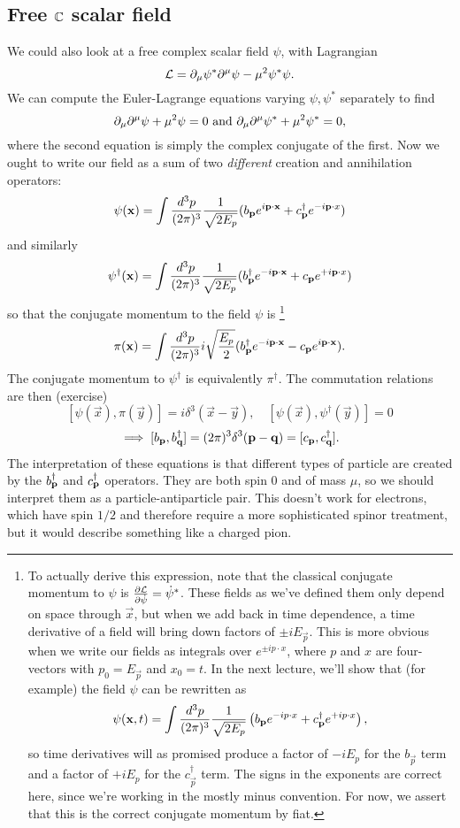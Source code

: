 \subsection*{Free $\mathbb{C}$ scalar field} We could also look at a free complex scalar field $\psi$, with Lagrangian
$$\mathcal L = \partial_\mu \psi^* \partial^\mu \psi - \mu^2 \psi^* \psi.$$
We can compute the Euler-Lagrange equations varying $\psi,\psi^*$ separately to find
$$\partial_\mu \partial^\mu \psi + \mu^2 \psi=0\text{ and }\partial_\mu \partial^\mu \psi^*+\mu^2 \psi^*=0,$$
where the second equation is simply the complex conjugate of the first.
Now we ought to write our field as a sum of two \emph{different} creation and annihilation operators:
$$\psi(\boldsymbol{\mathbf{x}})=\int \frac{d^3p}{(2\pi)^3}\frac{1}{\sqrt{2E_p}} (b_{\boldsymbol{\mathbf{p}}} e^{i \boldsymbol{\mathbf{p}} \cdot \boldsymbol{\mathbf{x}}} + c_{\boldsymbol{\mathbf{p}}}^\dagger e^{-i \boldsymbol{\mathbf{p}} \cdot x})$$
and similarly
$$\psi^\dagger (\boldsymbol{\mathbf{x}})=\int \frac{d^3p}{(2\pi)^3} \frac{1}{\sqrt{2E_p}} (b_{\boldsymbol{\mathbf{p}}}^\dagger e^{-i \boldsymbol{\mathbf{p}} \cdot \boldsymbol{\mathbf{x}}} + c_{\boldsymbol{\mathbf{p}}} e^{+i \boldsymbol{\mathbf{p}} \cdot x})$$
so that the conjugate momentum to the field $\psi$ is%
    \footnote{To actually derive this expression, note that the classical conjugate momentum to $\psi$ is $\frac{\partial \mathcal L}{\partial \dot \psi}=\dot \psi^*$. These fields as we've defined them only depend on space through $\vec x$, but when we add back in time dependence, a time derivative of a field will bring down factors of $\pm iE_{\vec p}$. This is more obvious when we write our fields as integrals over $e^{\pm ip \cdot x}$, where $p$ and $x$ are four-vectors with $p_0=E_{\vec p}$ and $x_0=t$. In the next lecture, we'll show that (for example) the field $\psi$ can be rewritten as
    \begin{equation*}
        \psi(\boldsymbol{\mathbf{x}},t) = \int \frac{d^3p}{(2\pi)^3} \frac{1}{\sqrt{2E_p}} \left( b_{\boldsymbol{\mathbf{p}}} e^{-i p\cdot x}+c_{\boldsymbol{\mathbf{p}}}^\dagger e^{+i p\cdot x}\right),
    \end{equation*}
    so time derivatives will as promised produce a factor of $-iE_p$ for the $b_{\vec p}$ term and a factor of $+iE_p$ for the $c_{\vec p}^\dagger$ term.
    The signs in the exponents are correct here, since we're working in the mostly minus convention. For now, we assert that this is the correct conjugate momentum by fiat.}
$$\pi(\boldsymbol{\mathbf{x}})=\int \frac{d^3p}{(2\pi)^3} i\sqrt{\frac{E_p}{2}} (b_{\boldsymbol{\mathbf{p}}}^\dagger e^{-i \boldsymbol{\mathbf{p}} \cdot \boldsymbol{\mathbf{x}}}-c_{\boldsymbol{\mathbf{p}}} e^{i \boldsymbol{\mathbf{p}} \cdot \boldsymbol{\mathbf{x}}}).$$
The conjugate momentum to $\psi^\dagger$ is equivalently $\pi^\dagger$. The commutation relations are then (exercise)
$$[\psi(\vec x), \pi(\vec y)]=i\delta^3(\vec x - \vec y), \quad 
[\psi(\vec x),\psi^\dagger(\vec y)]=0$$
$$\implies [b_{\boldsymbol{\mathbf{p}}},b_{\boldsymbol{\mathbf{q}}}^\dagger]=(2\pi)^3 \delta^3 (\boldsymbol{\mathbf{p}} - \boldsymbol{\mathbf{q}})=[c_{\boldsymbol{\mathbf{p}}},c_{\boldsymbol{\mathbf{q}}}^\dagger].$$
The interpretation of these equations is that different types of particle are created by the $b_{\boldsymbol{\mathbf{p}}}^\dagger$ and $c_{\boldsymbol{\mathbf{p}}}^\dagger$ operators. They are both spin $0$ and of mass $\mu$, so we should interpret them as a particle-antiparticle pair. This doesn't work for electrons, which have spin $1/2$ and therefore require a more sophisticated spinor treatment, but it would describe something like a charged pion.


